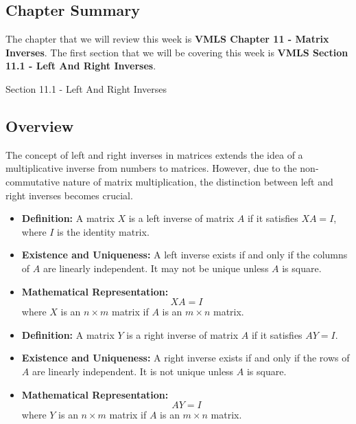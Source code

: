 \newpage

\subsection{Chapter Summary}

The chapter that we will review this week is \textbf{VMLS Chapter 11 - Matrix Inverses}. The first section that we will be covering this week is \textbf{VMLS Section 11.1 - Left And Right Inverses}.

\begin{notes}{Section 11.1 - Left And Right Inverses}
    \subsection*{Overview}

    The concept of left and right inverses in matrices extends the idea of a multiplicative inverse from numbers to matrices. However, due to the non-commutative nature of matrix multiplication, the 
    distinction between left and right inverses becomes crucial. \vspace*{1em}

    \begin{highlight}
        \begin{itemize}
            \item \textbf{Definition:} A matrix $X$ is a left inverse of matrix $A$ if it satisfies $XA = I$, where $I$ is the identity matrix.
            \item \textbf{Existence and Uniqueness:} A left inverse exists if and only if the columns of $A$ are linearly independent. It may not be unique unless $A$ is square.
            \item \textbf{Mathematical Representation:}
            \begin{equation*}
                XA = I
            \end{equation*}
            where $X$ is an $n \times m$ matrix if $A$ is an $m \times n$ matrix.
        \end{itemize}
    \end{highlight}

    \begin{highlight}
        \begin{itemize}
            \item \textbf{Definition:} A matrix $Y$ is a right inverse of matrix $A$ if it satisfies $AY = I$.
            \item \textbf{Existence and Uniqueness:} A right inverse exists if and only if the rows of $A$ are linearly independent. It is not unique unless $A$ is square.
            \item \textbf{Mathematical Representation:} 
            \begin{equation*}
                AY = I
            \end{equation*}
            where $Y$ is an $n \times m$ matrix if $A$ is an $m \times n$ matrix.
        \end{itemize}
    \end{highlight}


\end{notes}
